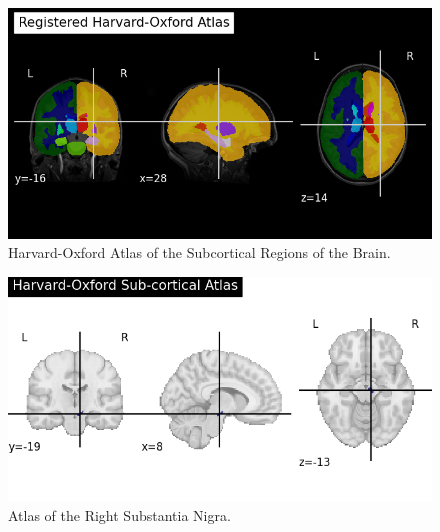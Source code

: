 \documentclass[12pt]{article}
\begin{document}
\FloatBarrier  %

\begin{figure}[h]  %
    \centering
    \includegraphics[width=\textwidth]{"../img/regions.png"}  %
    \caption{Harvard-Oxford Atlas of the Subcortical Regions of the Brain.}
    \label{fig:subcortex}  %
\end{figure}

\FloatBarrier  %

\begin{figure}[h]  %
    \centering
    \includegraphics[width=\textwidth]{"../img/brain_atlas.png"}  %
    \caption{Atlas of the Right Substantia Nigra.}
    \label{fig:SNR}  %
\end{figure}

\FloatBarrier  %
\end{document}
